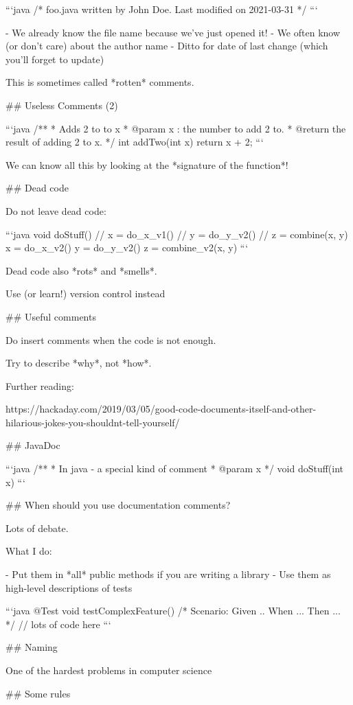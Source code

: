 ```java
/* foo.java written by John Doe.
   Last modified on 2021-03-31
*/
```

- We already know the file name because  we've just opened it!
- We often know (or don't care) about the author name
- Ditto for date of last change (which you'll forget to update)

This is sometimes called *rotten* comments.

## Useless Comments (2)

```java
/**
* Adds 2 to to x
* @param x : the number to add 2 to.
* @return the result of adding 2 to x.
*/
int addTwo(int x) {
  return x + 2;
}
```

We can know all this by looking at the *signature of the function*!


## Dead code

Do not leave dead code:

```java
void doStuff() {
    // x = do_x_v1()
    // y = do_y_v2()
    // z = combine(x, y)
    x = do_x_v2()
    y = do_y_v2()
    z = combine_v2(x, y)
}
```

Dead code also *rots* and *smells*.

Use (or learn!) version control instead

## Useful comments

Do insert comments when the code is not enough.

Try to describe *why*, not *how*.

Further reading:

https://hackaday.com/2019/03/05/good-code-documents-itself-and-other-hilarious-jokes-you-shouldnt-tell-yourself/

## JavaDoc

```java
/**
 * In java - a special kind of comment
 * @param x
 */
void doStuff(int x) {
}
```

## When should you use documentation comments?

Lots of debate.

What I do:

- Put them in *all* public methods if you are writing a library
- Use them as high-level descriptions of tests


```java
@Test
void testComplexFeature() {
    /*
    Scenario:
    Given ..
    When ...
    Then ...
    */
    // lots of code here
}
```


##  Naming

One of the hardest problems in computer science

## Some rules

